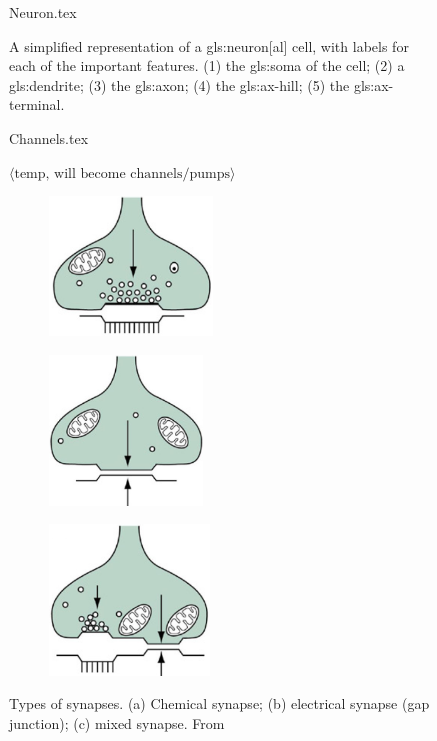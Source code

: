 \documentclass[class={myRUCProject}, crop=false]{standalone}
\begin{document}
\begin{figure}[H]
    \centering
    {Neuron.tex}
    \caption{A simplified representation of a \gls{gls:neuron}[al] cell, with labels for each of the important features. (1) the \gls{gls:soma} of the cell; (2) a \gls{gls:dendrite}; (3) the \gls{gls:axon}; (4) the \gls{gls:ax-hill}; (5) the \gls{gls:ax-terminal}.}\label{fig:Neuron}
\end{figure}

\begin{figure}[H]
  \centering
  {Channels.tex}
  \caption{ $\langle \text{temp, will become channels/pumps} \rangle$ }\label{fig:Channels}
\end{figure}

\begin{figure}[H]
        \centering
        
    \begin{subfigure}[t]{0.3\textwidth}
        \centering
        \caption{}
        \includegraphics[height=3.7cm]{Pictures/Anakin/chem.syn.png}
    \end{subfigure}
    \begin{subfigure}[t]{0.3\textwidth}
        \centering
        \caption{}
        \includegraphics[height=4cm]{Pictures/Anakin/el.syn.png}
    \end{subfigure}
    \begin{subfigure}[t]{0.3\textwidth}
        \centering
        \caption{}
        \includegraphics[height=4cm]{Pictures/Anakin/mix.syn.png}
    \end{subfigure}
    \caption{Types of synapses. (a) Chemical synapse; (b) electrical synapse (gap junction); (c) mixed synapse. From \cite{Hammond2015ch6}}\label{fig:synapses} 
\end{figure}
\end{document}

